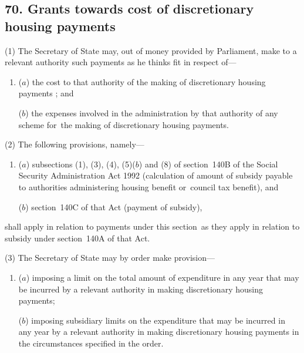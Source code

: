 \documentclass[12pt,a4paper]{article}
\begin{document}
\subsection{70. Grants towards cost of discretionary housing payments}

(1) The Secretary of State may, out of money provided by Parliament, make to a relevant authority such payments as he thinks fit in respect of—
\begin{enumerate}\item[]
($a$) the cost to that authority of the making of discretionary housing payments%
; and

($b$) the expenses involved in the administration by that authority of any scheme for~the making of discretionary housing payments.
\end{enumerate}

(2) The following provisions, namely—
\begin{enumerate}\item[]
($a$) subsections (1), (3), (4), (5)($b$)
and (8)  of section~140B of the Social Security Administration Act 1992 (calculation of amount of subsidy payable to authorities administering housing benefit or~council tax benefit), and

($b$) section~140C of that Act (payment of subsidy),
\end{enumerate}
shall apply in relation to payments under this section~as they apply in relation to subsidy under section~140A of that Act.


(3) The Secretary of State may by order make provision—
\begin{enumerate}\item[]
($a$) imposing a limit on the total amount of expenditure in any year that may be incurred by a relevant authority in making discretionary housing payments;

($b$) imposing subsidiary limits on the expenditure that may be incurred in any year by a relevant authority in making discretionary housing payments in the circumstances specified in the order.
\end{enumerate}
\end{document}
